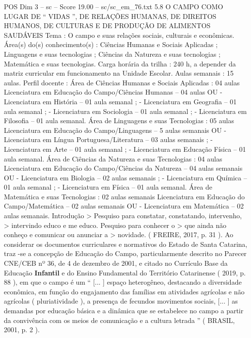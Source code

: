 \begin{textsample}{POS Dim 3 – sc – Score 19.00 – sc/sc\_em\_76.txt}  \label{ex:f3_pos_066}
5.8 O CAMPO COMO LUGAR DE “ VIDAS ”, DE RELAÇÕES HUMANAS, DE DIREITOS HUMANOS, DE CULTURAS E DE PRODUÇÃO DE ALIMENTOS SAUDÁVEIS Tema : O campo e suas relações sociais, culturais e econômicas.
Área(s) do(s) conhecimento(s) : Ciências Humanas e Sociais Aplicadas ; Linguagens e suas tecnologias ; Ciências da Natureza e suas tecnologias ; Matemática e suas tecnologias.
Carga horária da trilha : 240 h, a depender da matriz curricular em funcionamento na Unidade Escolar.
Aulas semanais : 15 aulas.
Perfil docente : Área de Ciências Humanas e Sociais Aplicadas : 04 aulas Licenciatura em Educação do Campo/Ciências Humanas – 04 aulas OU - Licenciatura em História – 01 aula semanal ; - Licenciatura em Geografia – 01 aula semanal ; - Licenciatura em Sociologia – 01 aula semanal ; - Licenciatura em Filosofia – 01 aula semanal.
Área de Linguagens e suas Tecnologias : 05 aulas Licenciatura em Educação do Campo/Linguagens – 5 aulas semanais OU - Licenciatura em Língua Portuguesa/Literatura – 03 aulas semanais ; - Licenciatura em Arte – 01 aula semanal ; - Licenciatura em Educação Física – 01 aula semanal.
Área de Ciências da Natureza e suas Tecnologias : 04 aulas Licenciatura em Educação do Campo/Ciências da Natureza – 04 aulas semanais OU - Licenciatura em Biologia – 02 aulas semanais ; - Licenciatura em Química – 01 aula semanal ; - Licenciatura em Física – 01 aula semanal.
Área de Matemática e suas Tecnologias : 02 aulas semanais Licenciatura em Educação do Campo/Matemática – 02 aulas semanais OU - Licenciatura em Matemática – 02 aulas semanais.
Introdução > Pesquiso para constatar, constatando, intervenho, > intervindo educo e me educo.
Pesquiso para conhecer o > que ainda não conheço e comunicar ou anunciar a > novidade. ( FREIRE, 2017, p. 31 ).
Ao considerar os documentos curriculares e normativos do Estado de Santa Catarina, traz -se a concepção de Educação do Campo, particularmente descrito no Parecer CNE/CEB nº 36, de 4 de dezembro de 2001, e citado no Currículo Base da Educação \textbf{Infantil} e do Ensino Fundamental do Território Catarinense ( 2019, p. 88 ), em que o campo é um “ [... ] espaço heterogêneo, destacando a diversidade econômica, em função do engajamento das famílias em atividades agrícolas e não agrícolas ( pluriatividade ), a presença de fecundos movimentos sociais, [... ] as demandas por educação básica e a dinâmica que se estabelece no campo a partir da convivência com os meios de comunicação e a cultura letrada ” ( BRASIL, 2001, p. 2 ).

\end{textsample}
